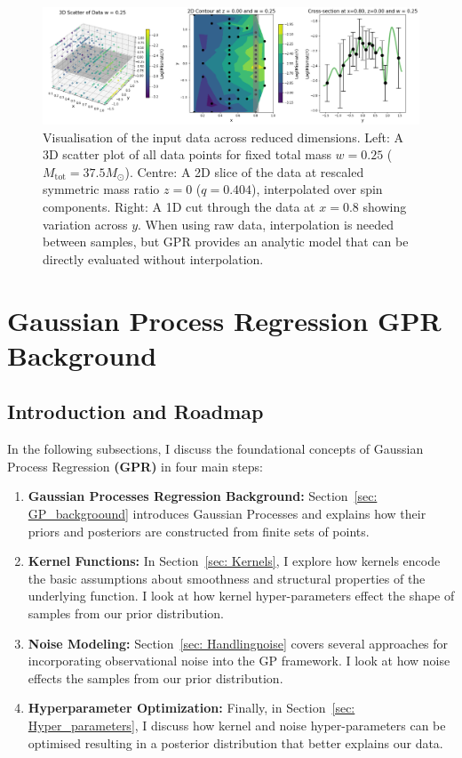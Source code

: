 \documentclass[12pt]{article}
\begin{document}
\begin{figure}[H]
    \centering
    \includegraphics[width=1\textwidth]{LatexPlots/final_gps_plots/data_visual.png}
    \caption{
    Visualisation of the input data across reduced dimensions. 
    Left: A 3D scatter plot of all data points for fixed total mass \(w = 0.25\) ($M_\text{tot}=37.5 M_\odot$). 
    Centre: A 2D slice of the data at rescaled symmetric mass ratio \(z = 0\) ($q=0.404$), interpolated over spin components.
    Right: A 1D cut through the data at \(x = 0.8\) showing variation across \(y\). 
    When using raw data, interpolation is needed between samples, but GPR provides an analytic model that can be directly evaluated without interpolation.
    }
    \label{fig:visualising_data}
\end{figure}








\section{Gaussian Process Regression \textbf{GPR} Background}
\subsection{Introduction and Roadmap}

In the following subsections, I discuss the foundational concepts of Gaussian Process Regression \textbf{(GPR)} in four main steps:
\begin{enumerate}
    \item \textbf{Gaussian Processes Regression Background:} Section~\ref{sec: GP_backgroound} introduces Gaussian Processes and explains how their priors and posteriors are constructed from finite sets of points.
    \item \textbf{Kernel Functions:} In Section~\ref{sec: Kernels}, I explore how kernels encode the basic assumptions about smoothness and structural properties of the underlying function. I look at how kernel hyper-parameters effect the shape of samples from our prior distribution.
    \item \textbf{Noise Modeling:} Section~\ref{sec: Handlingnoise} covers several approaches for incorporating observational noise into the GP framework. I look at how noise effects the samples from our prior distribution.
    \item \textbf{Hyperparameter Optimization:} Finally, in Section~\ref{sec: Hyper_parameters}, I discuss how kernel and noise hyper-parameters can be optimised resulting in a posterior distribution that better explains our data.
\end{enumerate}
\end{document}
